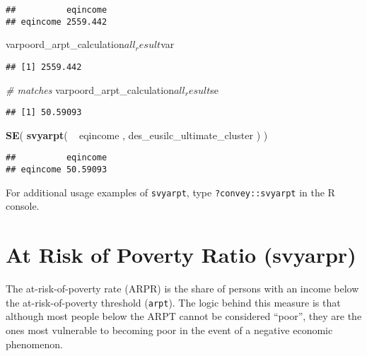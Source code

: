 \documentclass[]{book}
\newenvironment{Shaded}{\begin{snugshade}}{\end{snugshade}}
\newcommand{\KeywordTok}[1]{\textcolor[rgb]{0.13,0.29,0.53}{\textbf{{#1}}}}
\newcommand{\StringTok}[1]{\textcolor[rgb]{0.31,0.60,0.02}{{#1}}}
\newcommand{\CommentTok}[1]{\textcolor[rgb]{0.56,0.35,0.01}{\textit{{#1}}}}
\newcommand{\NormalTok}[1]{{#1}}
\begin{document}
\begin{verbatim}
##          eqincome
## eqincome 2559.442
\end{verbatim}

\begin{Shaded}
\begin{Highlighting}[]
\NormalTok{varpoord_arpt_calculation$all_result$var}
\end{Highlighting}
\end{Shaded}

\begin{verbatim}
## [1] 2559.442
\end{verbatim}

\begin{Shaded}
\begin{Highlighting}[]
\CommentTok{# matches}
\NormalTok{varpoord_arpt_calculation$all_result$se}
\end{Highlighting}
\end{Shaded}

\begin{verbatim}
## [1] 50.59093
\end{verbatim}

\begin{Shaded}
\begin{Highlighting}[]
\KeywordTok{SE}\NormalTok{( }\KeywordTok{svyarpt}\NormalTok{( ~}\StringTok{ }\NormalTok{eqincome , des_eusilc_ultimate_cluster ) )}
\end{Highlighting}
\end{Shaded}

\begin{verbatim}
##          eqincome
## eqincome 50.59093
\end{verbatim}

For additional usage examples of \texttt{svyarpt}, type
\texttt{?convey::svyarpt} in the R console.

\section{At Risk of Poverty Ratio
(svyarpr)}\label{at-risk-of-poverty-ratio-svyarpr}

The at-risk-of-poverty rate (ARPR) is the share of persons with an
income below the at-risk-of-poverty threshold (\texttt{arpt}). The logic
behind this measure is that although most people below the ARPT cannot
be considered ``poor'', they are the ones most vulnerable to becoming
poor in the event of a negative economic phenomenon.
\end{document}
